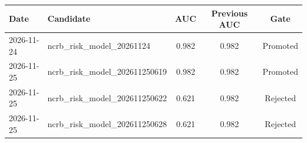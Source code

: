\begin{tabular}{llccc}
\hline
Date & Candidate & AUC & Previous AUC & Gate \\
\hline
2026-11-24 & ncrb\_risk\_model\_20261124 & 0.982 & 0.982 & Promoted \\
2026-11-25 & ncrb\_risk\_model\_202611250619 & 0.982 & 0.982 & Promoted \\
2026-11-25 & ncrb\_risk\_model\_202611250622 & 0.621 & 0.982 & Rejected \\
2026-11-25 & ncrb\_risk\_model\_202611250628 & 0.621 & 0.982 & Rejected \\
\hline
\end{tabular}
